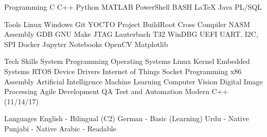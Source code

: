 

\begin{cvskills}

\cvskill
{Programming} %
{C \SkillSep C++ \SkillSep Python \SkillSep MATLAB \SkillSep PowerShell \SkillSep BASH \SkillSep LaTeX \SkillSep Java \SkillSep PL/SQL} %

\cvskill
{Tools} %
{Linux \SkillSep Windows \SkillSep Git \SkillSep YOCTO Project \SkillSep BuildRoot \SkillSep Cross Compiler \SkillSep NASM Assembly \SkillSep GDB \SkillSep GNU Make \SkillSep JTAG \SkillSep Lauterbach T32 \SkillSep WinDBG \SkillSep UEFI \SkillSep UART, I2C, SPI \SkillSep Docker \SkillSep Jupyter Notebooks \SkillSep OpenCV \SkillSep Matplotlib} %

\cvskill
{Tech Skills} %
{System Programming \SkillSep Operating Systems \SkillSep Linux Kernel \SkillSep Embedded Systems \SkillSep RTOS \SkillSep Device Drivers \SkillSep Internet of Things \SkillSep Socket Programming \SkillSep x86 Assembly \SkillSep Artificial Intelligence \SkillSep Machine Learning \SkillSep Computer Vision \SkillSep Digital Image Processing \SkillSep Agile Development \SkillSep QA Test and Automation \SkillSep Modern C++ (11/14/17)} %

\cvskill
{Languages} %
{English - Bilingual (C2) \SkillSep German - Basic (Learning) \SkillSep Urdu - Native \SkillSep Punjabi - Native \SkillSep Arabic - Readable} %

\end{cvskills}
